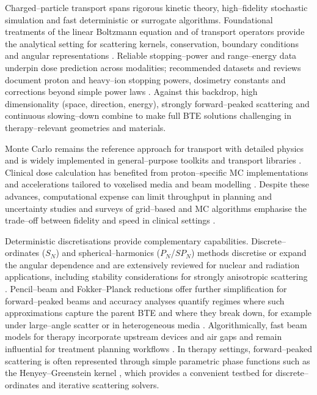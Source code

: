 \documentclass[final]{amsart}
\begin{document}
Charged--particle transport spans rigorous kinetic theory,
high--fidelity stochastic simulation and fast deterministic or
surrogate algorithms.  Foundational treatments of the linear Boltzmann
equation and of transport operators provide the analytical setting for
scattering kernels, conservation, boundary conditions and angular
representations
\cite{case1968linear,lewis1984computational,pomraning1991linear,wilson1988charged}.
Reliable stopping--power and range--energy data underpin dose
prediction across modalities; recommended datasets and reviews
document proton and heavy--ion stopping powers, dosimetry constants
and corrections beyond simple power laws
\cite{berger1982stopping,berger1998stopping,international1993stopping,seltzer2016key,sigmund2009errata}.
Against this backdrop, high dimensionality (space, direction, energy),
strongly forward--peaked scattering and continuous slowing--down
combine to make full BTE solutions challenging in therapy--relevant
geometries and materials.

Monte Carlo remains the reference approach for transport with detailed
physics and is widely implemented in general--purpose toolkits and
transport libraries
\cite{agostinelli2003geant4,goorley2012initial,lux2018monte}. Clinical
dose calculation has benefited from proton--specific MC
implementations and accelerations tailored to voxelised media and beam
modelling \cite{fippel2004monte}. Despite these advances,
computational expense can limit throughput in planning and uncertainty
studies and surveys of grid--based and MC algorithms emphasise the
trade--off between fidelity and speed in clinical settings
\cite{kan2013review}.

Deterministic discretisations provide complementary capabilities.
Discrete--ordinates ($S_N$) and spherical--harmonics ($P_N$/$SP_N$)
methods discretise or expand the angular dependence and are
extensively reviewed for nuclear and radiation applications, including
stability considerations for strongly anisotropic scattering
\cite{yu2025review}.  Pencil--beam and Fokker--Planck reductions offer
further simplification for forward--peaked beams and accuracy analyses
quantify regimes where such approximations capture the parent BTE and
where they break down, for example under large--angle scatter or in
heterogeneous media \cite{borgers1996accuracy}. Algorithmically, fast
beam models for therapy incorporate upstream devices and air gaps and
remain influential for treatment planning workflows
\cite{hong1996pencil}.
In therapy settings, forward--peaked scattering is often represented
through simple parametric phase functions such as the Henyey--Greenstein
kernel \cite{henyey1941diffuse}, which provides a convenient testbed for
discrete--ordinates and iterative scattering solvers.
\end{document}
